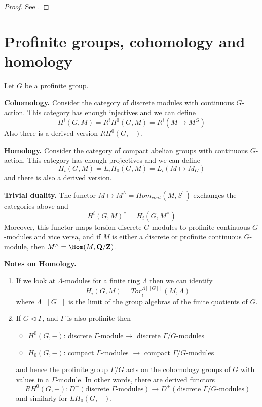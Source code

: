 \begin{proof}
See \cite{WeilII}.
\end{proof}




\section{Profinite groups, cohomology and homology}
\label{section-profinite-cohomology}

\noindent
Let $G$ be a profinite group.

\medskip\noindent
{\bf Cohomology.}
Consider the category of discrete modules with continuous $G$-action.
This category has enough injectives and we can define
$$
H^i(G, M) = R^iH^0(G, M) = R^i(M\mapsto M^G)
$$
Also there is a derived version $RH^0(G, -)$.

\medskip\noindent
{\bf Homology.}
Consider the category of compact abelian groups with continuous $G$-action.
This category has enough projectives and we can define
$$
H_i(G, M) = L_iH_0(G, M)=L_i(M\mapsto M_G)
$$
and there is also a derived version.

\medskip\noindent
{\bf Trivial duality.}
The functor $M\mapsto M^\wedge = Hom_{cont}(M, S^1)$
exchanges the categories above and
$$
H^i(G, M)^\wedge = H_i(G, M^\wedge)
$$
Moreover, this functor maps torsion discrete $G$-modules to profinite
continuous $G$-modules and vice versa, and if $M$ is either a discrete or
profinite continuous $G$-module, then
$M^\wedge = \Hom(M, \mathbf{Q}/\mathbf{Z})$.

\medskip\noindent
{\bf Notes on Homology.}
\begin{enumerate}
\item If we look at $\Lambda$-modules for a finite ring $\Lambda$
then we can identify
$$
H_i(G, M)=Tor_i^{\Lambda[[G]]}(M, \Lambda)
$$
where $\Lambda[[G]]$ is the limit of the group algebras of the finite
quotients of $G$.
\item If $G \vartriangleleft \Gamma$, and $\Gamma$ is also profinite
then
\begin{itemize}
\item $H^0(G, -)$: discrete $\Gamma$-module$\to$ discrete
$\Gamma/G$-modules
\item $H_0(G, -)$: compact $\Gamma$-modules $\to$ compact
$\Gamma/G$-modules
\end{itemize}
and hence the profinite group $\Gamma/G$ acts on the cohomology groups
of $G$ with values in a $\Gamma$-module. In other words, there are derived
functors
$$
RH^0(G, -) :
D^{+}(\text{discrete }\Gamma\text{-modules})
\longrightarrow
D^{+}(\text{discrete }\Gamma/G\text{-modules})
$$
and similarly for $LH_0(G, -)$.
\end{enumerate}








